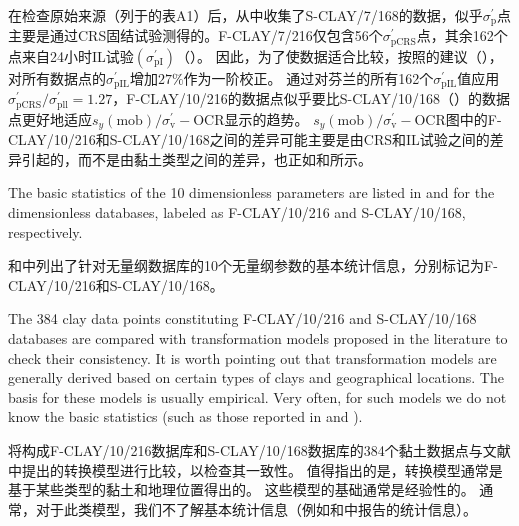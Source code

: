 \begin{ParaColumn}
    \switchcolumn
    
    在检查原始来源（列于\citet{Ching2014663}的表A1）后，从中收集了S-CLAY/7/168的数据，似乎$\sigma_{\mathrm{p}}^{\prime}$点主要是通过CRS固结试验测得的。F-CLAY/7/216仅包含56个$\sigma_{\mathrm{pCRS}}^{\prime}$点，其余162个点来自24小时IL试验$\left(\sigma_{\mathrm{pI}}^{\prime}\right)$（）。 因此，为了使数据适合比较，按照\citet{Länsivaara1999}的建议（），对所有数据点的$\sigma_{\mathrm{pIL}}^{\prime}$增加$27\%$作为一阶校正。 通过对芬兰的所有162个$\sigma_{\mathrm{pIL}}^{\prime}$值应用$\sigma_{\mathrm{pCRS}}^{\prime} / \sigma_{\mathrm{pll}}^{\prime}=1.27$，F-CLAY/10/216的数据点似乎要比S-CLAY/10/168（）的数据点更好地适应$s_{y}(\mathrm{mob}) / \sigma_{\mathrm{v}}^{\prime}-\mathrm{OCR}$显示的趋势。  $s_{y}(\mathrm{mob}) / \sigma_{\mathrm{v}}^{\prime}-\mathrm{OCR}$图中的F-CLAY/10/216和S-CLAY/10/168之间的差异可能主要是由CRS和IL试验之间的差异引起的，而不是由黏土类型之间的差异，也正如和所示。

    \switchcolumn*

    The basic statistics of the 10 dimensionless parameters are listed in  and  for the dimensionless databases, labeled as F-CLAY/10/216 and S-CLAY/10/168, respectively.

    \switchcolumn

    和中列出了针对无量纲数据库的10个无量纲参数的基本统计信息，分别标记为F-CLAY/10/216和S-CLAY/10/168。
   
    
    

    
    The 384 clay data points constituting F-CLAY/10/216 and S-CLAY/10/168 databases are compared with transformation models proposed in the literature to check their consistency. It is worth pointing out that transformation models are generally derived based on certain types of clays and geographical locations. The basis for these models is usually empirical. Very often, for such models we do not know the basic statistics (such as those reported in  and  ).

    \switchcolumn

    将构成F-CLAY/10/216数据库和S-CLAY/10/168数据库的384个黏土数据点与文献中提出的转换模型进行比较，以检查其一致性。 值得指出的是，转换模型通常是基于某些类型的黏土和地理位置得出的。 这些模型的基础通常是经验性的。 通常，对于此类模型，我们不了解基本统计信息（例如和中报告的统计信息）。


\end{ParaColumn}
